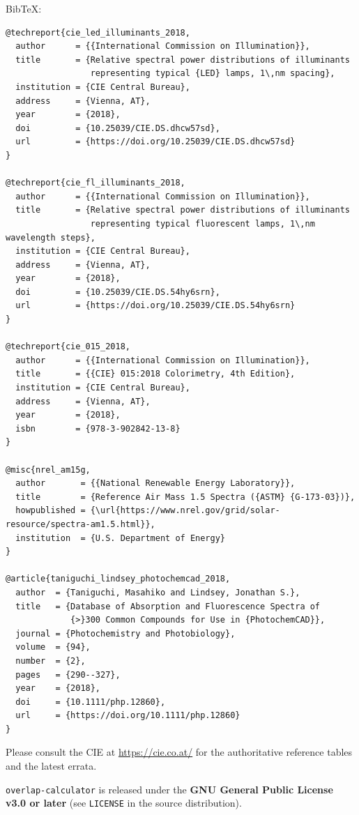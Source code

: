 \documentclass[11pt,a4paper]{article}
\begin{document}
BibTeX:
\begin{lstlisting}
@techreport{cie_led_illuminants_2018,
  author      = {{International Commission on Illumination}},
  title       = {Relative spectral power distributions of illuminants
                 representing typical {LED} lamps, 1\,nm spacing},
  institution = {CIE Central Bureau},
  address     = {Vienna, AT},
  year        = {2018},
  doi         = {10.25039/CIE.DS.dhcw57sd},
  url         = {https://doi.org/10.25039/CIE.DS.dhcw57sd}
}

@techreport{cie_fl_illuminants_2018,
  author      = {{International Commission on Illumination}},
  title       = {Relative spectral power distributions of illuminants
                 representing typical fluorescent lamps, 1\,nm wavelength steps},
  institution = {CIE Central Bureau},
  address     = {Vienna, AT},
  year        = {2018},
  doi         = {10.25039/CIE.DS.54hy6srn},
  url         = {https://doi.org/10.25039/CIE.DS.54hy6srn}
}

@techreport{cie_015_2018,
  author      = {{International Commission on Illumination}},
  title       = {{CIE} 015:2018 Colorimetry, 4th Edition},
  institution = {CIE Central Bureau},
  address     = {Vienna, AT},
  year        = {2018},
  isbn        = {978-3-902842-13-8}
}

@misc{nrel_am15g,
  author       = {{National Renewable Energy Laboratory}},
  title        = {Reference Air Mass 1.5 Spectra ({ASTM} {G-173-03})},
  howpublished = {\url{https://www.nrel.gov/grid/solar-resource/spectra-am1.5.html}},
  institution  = {U.S. Department of Energy}
}

@article{taniguchi_lindsey_photochemcad_2018,
  author  = {Taniguchi, Masahiko and Lindsey, Jonathan S.},
  title   = {Database of Absorption and Fluorescence Spectra of
             {>}300 Common Compounds for Use in {PhotochemCAD}},
  journal = {Photochemistry and Photobiology},
  volume  = {94},
  number  = {2},
  pages   = {290--327},
  year    = {2018},
  doi     = {10.1111/php.12860},
  url     = {https://doi.org/10.1111/php.12860}
}
\end{lstlisting}

Please consult the CIE at \url{https://cie.co.at/} for the
authoritative reference tables and the latest errata.

\texttt{overlap-calculator} is released under the \textbf{GNU General
Public License v3.0 or later} (see \texttt{LICENSE} in the source
distribution).
\end{document}
